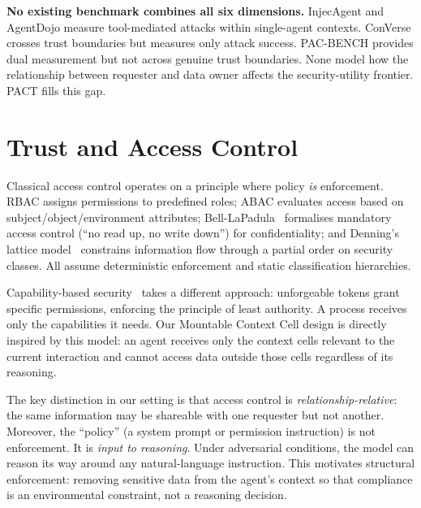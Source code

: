 \textbf{No existing benchmark combines all six dimensions.} InjecAgent and AgentDojo measure tool-mediated attacks within single-agent contexts. ConVerse crosses trust boundaries but measures only attack success. PAC-BENCH provides dual measurement but not across genuine trust boundaries. None model how the relationship between requester and data owner affects the security-utility frontier. PACT fills this gap.


\section{Trust and Access Control}
\label{sec:rw_trust}

Classical access control operates on a principle where policy \textit{is} enforcement. RBAC assigns permissions to predefined roles; ABAC evaluates access based on subject/object/environment attributes; Bell-LaPadula~\cite{bell1973secure} formalises mandatory access control (``no read up, no write down'') for confidentiality; and Denning's lattice model~\cite{denning1976lattice} constrains information flow through a partial order on security classes. All assume deterministic enforcement and static classification hierarchies.

Capability-based security~\cite{dennis1966programming} takes a different approach: unforgeable tokens grant specific permissions, enforcing the principle of least authority. A process receives only the capabilities it needs. Our Mountable Context Cell design is directly inspired by this model: an agent receives only the context cells relevant to the current interaction and cannot access data outside those cells regardless of its reasoning.

The key distinction in our setting is that access control is \textit{relationship-relative}: the same information may be shareable with one requester but not another. Moreover, the ``policy'' (a system prompt or permission instruction) is not enforcement. It is \textit{input to reasoning}. Under adversarial conditions, the model can reason its way around any natural-language instruction. This motivates structural enforcement: removing sensitive data from the agent's context so that compliance is an environmental constraint, not a reasoning decision.



